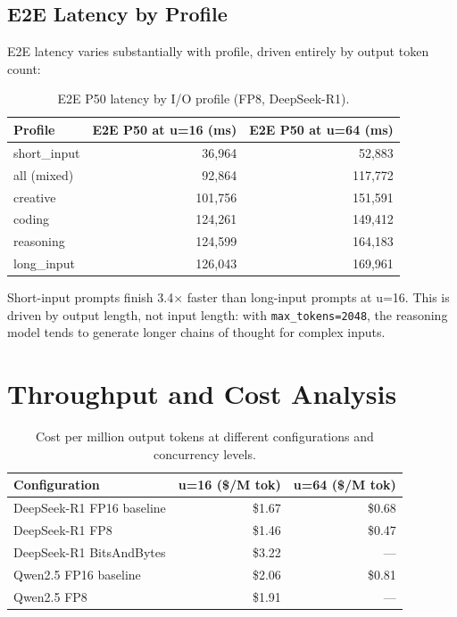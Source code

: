 \documentclass[a4paper,12pt]{report}
\begin{document}
\subsection{E2E Latency by Profile}

E2E latency varies substantially with profile, driven entirely by output token count:

\begin{table}[h!]
\caption{E2E P50 latency by I/O profile (FP8, DeepSeek-R1).}
\centering
\begin{tabular}{|l|r|r|}
\hline
\textbf{Profile} & \textbf{E2E P50 at u=16 (ms)} & \textbf{E2E P50 at u=64 (ms)} \\
\hline
short\_input & 36{,}964 & 52{,}883 \\
all (mixed) & 92{,}864 & 117{,}772 \\
creative & 101{,}756 & 151{,}591 \\
coding & 124{,}261 & 149{,}412 \\
reasoning & 124{,}599 & 164{,}183 \\
long\_input & 126{,}043 & 169{,}961 \\
\hline
\end{tabular}
\label{table:io_profiles}
\end{table}

Short-input prompts finish 3.4$\times$ faster than long-input prompts at u=16. This is driven by output length, not input length: with \texttt{max\_tokens=2048}, the reasoning model tends to generate longer chains of thought for complex inputs.

\section{Throughput and Cost Analysis}

\begin{table}[htbp]
\caption{Cost per million output tokens at different configurations and concurrency levels.}
\centering
\begin{tabular}{|l|r|r|}
\hline
\textbf{Configuration} & \textbf{u=16 (\$/M tok)} & \textbf{u=64 (\$/M tok)} \\
\hline
DeepSeek-R1 FP16 baseline & \$1.67 & \$0.68 \\
DeepSeek-R1 FP8 & \$1.46 & \$0.47 \\
DeepSeek-R1 BitsAndBytes & \$3.22 & --- \\
Qwen2.5 FP16 baseline & \$2.06 & \$0.81 \\
Qwen2.5 FP8 & \$1.91 & --- \\
\hline
\end{tabular}
\label{table:cost}
\end{table}
\end{document}
